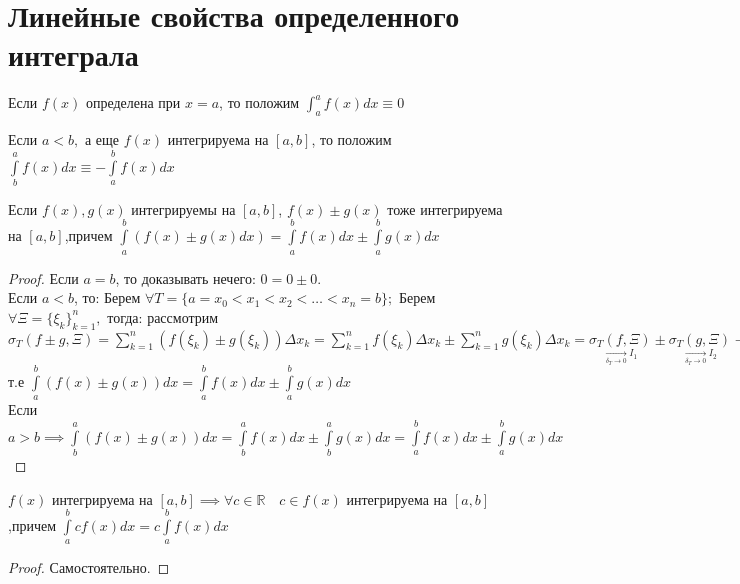 \documentclass[../main.tex]{subfiles}
\begin{document}
\section{Линейные свойства определенного интеграла}

\begin{definition}
    Если $f(x)$ определена при $x=a$, то положим $\int _{a}^{a}f(x)dx\equiv 0$
\end{definition}
\begin{definition}
    Если $a<b,$ а еще $f(x)$ интегрируема на $[a,b]$, то положим $\int\limits_{b}^{a}f(x)dx\equiv - \int\limits_{a}^{b}f(x)dx$
\end{definition}
\begin{theorem}
    Если $f(x),g(x)$ интегрируемы на $[a,b]$, $f(x)\pm g(x)$ тоже интегрируема на $[a,b]$,причем $\int\limits_{a}^{b}(f(x)\pm g(x)dx)= \int\limits_{a}^{b}f(x)dx \pm \int\limits_{a}^{b} g(x)dx$
\end{theorem}
\begin{proof}
    Если $a=b$, то доказывать нечего: $0=0\pm 0.$\\ 
    Если $a<b$, то: Берем $\forall T=\{a=x_{0}<x_{1}<x_{2}<\dots<x_{n}=b\};$ Берем $\forall \Xi=\{\xi_{k}\}_{k=1}^{n},$ тогда: 
    рассмотрим $\sigma_{T}(f\pm g,\Xi)=\sum_{k=1}^{n}(f(\xi_{k})\pm g(\xi_{k}))\Delta x_{k} =\sum_{k=1}^{n}f(\xi_{k})\Delta x_{k} \pm  \sum_{k=1}^{n} g(\xi_{k})\Delta x_{k}=\underset{\underset{\delta_{T}\to 0}{\to} I_{1}}{\sigma_{T}(f,\Xi)} \pm  \underset{\underset{\delta_{T}\to 0}{\to} I_{2}}{\sigma_{T}(g, \Xi)}\to I_{1}+I_{2},$ т.е $\int\limits_{a}^{b}(f(x)\pm g(x))dx=\int\limits_{a}^{b}f(x)dx \pm  \int\limits_{a}^{b}g(x)dx$\\ 
    Если $a>b \implies \int\limits_{b}^{a}(f(x)\pm g(x))dx=\int\limits_{b}^{a}f(x)dx\pm \int\limits_{b}^{a}g(x)dx= \int\limits_{a}^{b}f(x)dx\pm \int\limits_{a}^{b}g(x)dx$
\end{proof}
\begin{theorem}
    $f(x)$ интегрируема на $[a,b]\implies\forall c\in\mathbb{R}\quad c\in f(x)\text{ интегрируема на }[a,b]$,причем $\int\limits_{a}^{b}cf(x)dx=c \int\limits_{a}^{b}f(x)dx$
\end{theorem}
\begin{proof}
    Самостоятельно.
\end{proof}
\end{document}
